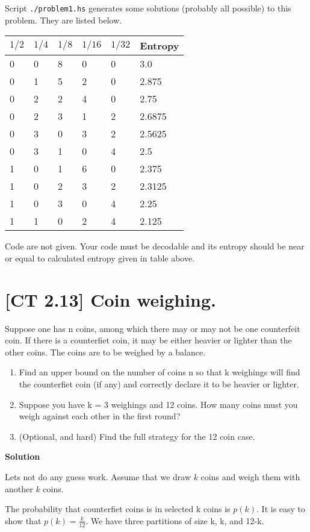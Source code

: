 \documentclass[10pt,answers]{exam}
\begin{document}
\begin{questions}
Script \texttt{./problem1.hs} generates some solutions (probably all
possible) to this problem. They are listed below.

\begin{longtable}[]{@{}llllll@{}}
\toprule
\(1/2\) & \(1/4\) & \(1/8\) & \(1/16\) & \(1/32\) &
Entropy\tabularnewline
\midrule
\endhead
0 & 0 & 8 & 0 & 0 & 3.0\tabularnewline
0 & 1 & 5 & 2 & 0 & 2.875\tabularnewline
0 & 2 & 2 & 4 & 0 & 2.75\tabularnewline
0 & 2 & 3 & 1 & 2 & 2.6875\tabularnewline
0 & 3 & 0 & 3 & 2 & 2.5625\tabularnewline
0 & 3 & 1 & 0 & 4 & 2.5\tabularnewline
1 & 0 & 1 & 6 & 0 & 2.375\tabularnewline
1 & 0 & 2 & 3 & 2 & 2.3125\tabularnewline
1 & 0 & 3 & 0 & 4 & 2.25\tabularnewline
1 & 1 & 0 & 2 & 4 & 2.125\tabularnewline
\bottomrule
\end{longtable}

Code are not given. Your code must be decodable and its entropy should
be near or equal to calculated entropy given in table above.


\section{{[}CT 2.13{]} Coin weighing.}\label{ct-2.13-coin-weighing.}

Suppose one has n coins, among which there may or may not be one
counterfeit coin. If there is a counterfiet coin, it may be either
heavier or lighter than the other coins. The coins are to be weighed by
a balance.

\begin{enumerate}
\def\labelenumi{\alph{enumi}.}
\item
  Find an upper bound on the number of coins n so that k weighings will
  find the counterfiet coin (if any) and correctly declare it to be
  heavier or lighter.
\item
  Suppose you have k = 3 weighings and 12 coins. How many coins must you
  weigh against each other in the first round?
\item
  (Optional, and hard) Find the full strategy for the 12 coin case.
\end{enumerate}

\textbf{Solution}

Lets not do any guess work. Assume that we draw \(k\) coins and weigh
them with another \(k\) coins.

The probability that counterfiet coins is in selected k coins is
\(p(k)\). It is easy to show that \(p(k) = \frac{k}{12}\). We have three
partitions of size k, k, and 12-k.


\end{questions}
\end{document}
